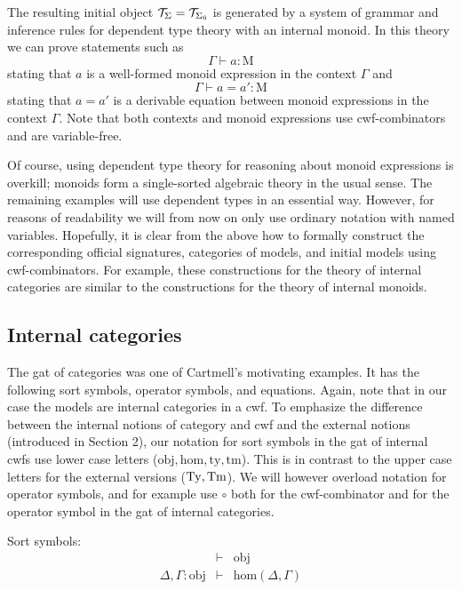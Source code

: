 \documentclass{lmcs}
\def\Obj{\mathrm{obj}}
\def\Hom{\mathrm{hom}}
\def\Mon{\mathrm{M}}
\newcommand{\ty}{\mathrm{ty}}
\newcommand{\tm}{\mathrm{tm}}
\begin{document}
The resulting initial object ${\mathcal T}_\Sigma = {\mathcal T}_{\Sigma_6}$ is generated by a system of grammar and inference rules for dependent type theory with an internal monoid. In this theory we can prove statements such as
$$
\Gamma \vdash a : \Mon
$$
stating that $a$ is a well-formed monoid expression in the context $\Gamma$ and
$$
\Gamma \vdash a = a': \Mon
$$
stating that $a = a'$ is a derivable equation between monoid expressions in the context $\Gamma$. Note that both contexts and monoid expressions use cwf-combinators and are variable-free.

Of course, using dependent type theory for reasoning about monoid expressions is overkill; monoids form a single-sorted algebraic theory in the usual sense.
The remaining examples will use dependent types in an essential way. However, for reasons of readability we will from now on only use ordinary notation with named variables. Hopefully, it is clear from the above how to formally construct the corresponding official signatures, categories of models, and initial models using cwf-combinators. For example, these constructions for the theory of internal categories are similar to the constructions for the theory of internal monoids.


\subsection{Internal categories} The gat of categories was one of Cartmell's motivating examples. It has the following sort symbols, operator symbols, and equations. Again, note that in our case the models are internal categories in a cwf. To emphasize the difference between the internal notions of category and cwf and the external notions (introduced in Section 2), our notation for sort symbols in the gat of internal cwfs use lower case letters ($\Obj, \Hom, \ty, \tm$). This is in contrast to the upper case letters for the external versions ($\mathrm{Ty}, \mathrm{Tm}$). We will however overload notation for operator symbols, and for example use $\circ$ both for the cwf-combinator and for the operator symbol in the gat of internal categories.

Sort symbols:
\begin{eqnarray*}
&\vdash& \Obj\\
\Delta, \Gamma : \Obj &\vdash& \Hom(\Delta,\Gamma)\\
\end{eqnarray*}
\end{document}
